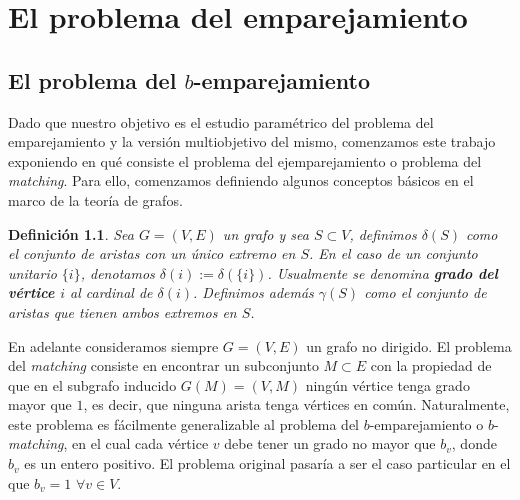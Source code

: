 \documentclass[twoside,a4paper,openright,12pt,tikz]{book}
\newtheorem{defi}{Definici\'on}[section]
\begin{document}


\newpage
\thispagestyle{empty}
\chapter{El problema del emparejamiento}
\section{El problema del $b$-emparejamiento}
Dado que nuestro objetivo es el estudio paramétrico del problema del emparejamiento y la versión multiobjetivo del mismo, comenzamos este trabajo exponiendo en qué consiste el problema del ejemparejamiento o problema del \textit{matching}. Para ello, comenzamos definiendo algunos conceptos básicos en el marco de la teoría de grafos.
\begin{defi}
Sea $G=(V,E)$ un grafo y sea $S \subset V$, definimos $\delta(S)$ como el conjunto de aristas con un único extremo en $S$. En el caso de un conjunto unitario $\{i\}$, denotamos $\delta(i):=\delta(\{i\})$. Usualmente se denomina \textbf{grado del vértice $i$} al cardinal de $\delta(i)$. Definimos además $\gamma(S)$ como el conjunto de aristas que tienen ambos extremos en $S$.
\end{defi}

En adelante consideramos siempre $G=(V,E)$ un grafo no dirigido. El problema del \textit{matching} consiste en encontrar un subconjunto $M\subset E$ con la propiedad de que en el subgrafo inducido $G(M)=(V,M)$ ningún vértice tenga grado mayor que $1$, es decir, que ninguna arista tenga vértices en común. Naturalmente, este problema es fácilmente generalizable al problema del $b$-emparejamiento o $b$-\textit{matching}, en el cual cada vértice $v$ debe tener un grado no mayor que $b_v$, donde $b_v$ es un entero positivo. El problema original pasaría a ser el caso particular en el que $b_v = 1$ $\forall v \in V$.
\end{document}
